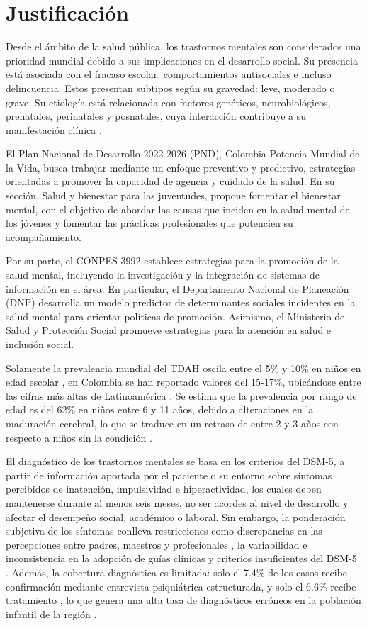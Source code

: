 \section{Justificación}

Desde el ámbito de la salud pública, los trastornos mentales son considerados una prioridad mundial debido a sus implicaciones en el desarrollo social. Su presencia está asociada con el fracaso escolar, comportamientos antisociales e incluso delincuencia. Estos presentan subtipos según su gravedad: leve, moderado o grave. Su etiología está relacionada con factores genéticos, neurobiológicos, prenatales, perinatales y posnatales, cuya interacción contribuye a su manifestación clínica \cite{Saxena2013}.

El Plan Nacional de Desarrollo 2022-2026 (PND), Colombia Potencia Mundial de la Vida, busca trabajar mediante  un enfoque preventivo y predictivo, estrategias orientadas a promover la capacidad de agencia y cuidado de la salud. En su sección, Salud y bienestar para las juventudes, propone fomentar el bienestar mental, con el objetivo de abordar las causas que inciden en la salud mental de los jóvenes y fomentar las prácticas profesionales que potencien su acompañamiento.

Por su parte, el CONPES 3992 establece estrategias para la promoción de la salud mental, incluyendo la investigación y la integración de sistemas de información en el área. En particular, el Departamento Nacional de Planeación (DNP) desarrolla un modelo predictor de determinantes sociales incidentes en la salud mental para orientar políticas de promoción. Asimismo, el Ministerio de Salud y Protección Social promueve estrategias para la atención en salud e inclusión social. 

Solamente la prevalencia mundial del TDAH oscila entre el 5\% y 10\% en niños en edad escolar \cite{GalianaSimal2020}, en Colombia se han reportado valores del 15-17\%, ubicándose entre las cifras más altas de Latinoamérica \cite{Pineda2003}. Se estima que la prevalencia por rango de edad es del 62\% en niños entre 6 y 11 años, debido a alteraciones en la maduración cerebral, lo que se traduce en un retraso de entre 2 y 3 años con respecto a niños sin la condición \cite{LlanosLizcano2019}.

El diagnóstico de los trastornos mentales se basa en los criterios del DSM-5, a partir de información aportada por el paciente o su entorno sobre síntomas percibidos de inatención, impulsividad e hiperactividad, los cuales deben mantenerse durante al menos seis meses, no ser acordes al nivel de desarrollo y afectar el desempeño social, académico o laboral. Sin embargo, la ponderación subjetiva de los síntomas conlleva restricciones como discrepancias en las percepciones entre padres, maestros y profesionales \cite{Narad2015}, la variabilidad e inconsistencia en la adopción de guías clínicas y criterios insuficientes del DSM-5 \cite{Eslami2021,Yeh2012}. Además, la cobertura diagnóstica es limitada: solo el 7.4\% de los casos recibe confirmación mediante entrevista psiquiátrica estructurada, y solo el 6.6\% recibe tratamiento \cite{Polanczyk2014}, lo que genera una alta tasa de diagnósticos erróneos en la población infantil de la región \cite{DeLaViudaSuarez2021}.

